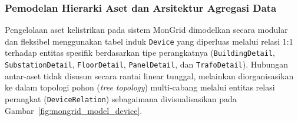 \subsubsection{Pemodelan Hierarki Aset dan Arsitektur Agregasi Data}

Pengelolaan aset kelistrikan pada sistem MonGrid dimodelkan secara modular dan fleksibel menggunakan tabel induk \texttt{Device} yang diperluas melalui relasi 1:1 terhadap entitas spesifik berdasarkan tipe perangkatnya (\texttt{BuildingDetail}, \texttt{SubstationDetail}, \texttt{FloorDetail}, \texttt{PanelDetail}, dan \texttt{TrafoDetail}). Hubungan antar-aset tidak disusun secara rantai linear tunggal, melainkan diorganisasikan ke dalam topologi pohon (\textit{tree topology}) multi-cabang melalui entitas relasi perangkat (\texttt{DeviceRelation}) sebagaimana divisualisasikan pada Gambar~\ref{fig:mongrid_model_device}.

